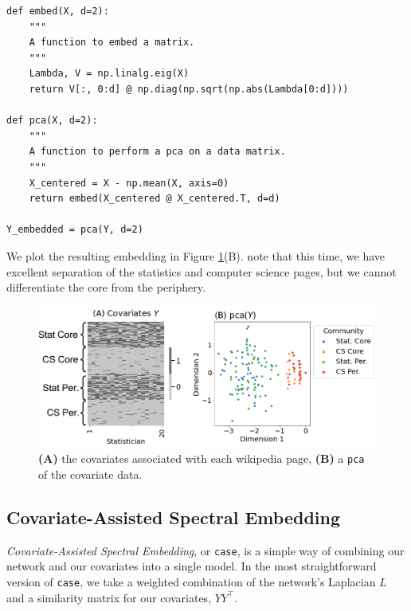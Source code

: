 \begin{lstlisting}[style=python]
def embed(X, d=2):
    """
    A function to embed a matrix.
    """
    Lambda, V = np.linalg.eig(X)
    return V[:, 0:d] @ np.diag(np.sqrt(np.abs(Lambda[0:d])))

def pca(X, d=2):
    """
    A function to perform a pca on a data matrix.
    """
    X_centered = X - np.mean(X, axis=0)
    return embed(X_centered @ X_centered.T, d=d)

Y_embedded = pca(Y, d=2)
\end{lstlisting}
We plot the resulting embedding in Figure \ref{fig:ch6:casc:cov_repr}(B). note that this time, we have excellent separation of the statistics and computer science pages, but we cannot differentiate the core from the periphery.

\begin{figure}[h]
    \centering
    \includegraphics[width=\linewidth]{representations/ch6/Images/casc_covs.png}
    \caption[\texttt{pca} of covariates]{\textbf{(A)} the covariates associated with each wikipedia page, \textbf{(B)} a \texttt{pca} of the covariate data.}
    \label{fig:ch6:casc:cov_repr}
\end{figure}

\subsection{Covariate-Assisted Spectral Embedding}

\textit{Covariate-Assisted Spectral Embedding}, or \texttt{case}, is a simple way of combining our network and our covariates into a single model. In the most straightforward version of \texttt{case}, we take a weighted combination of the network's Laplacian $L$ and a similarity matrix for our covariates, $YY^\top$. 

